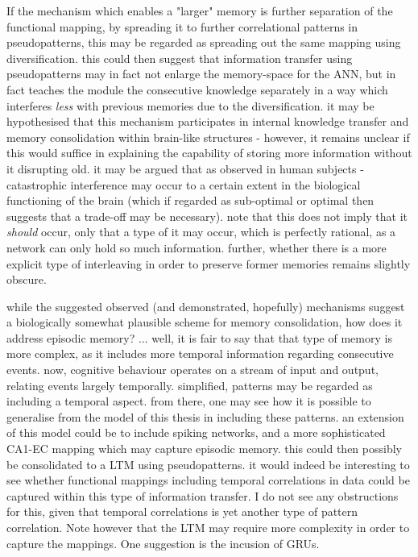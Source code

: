 If the mechanism which enables a "larger" memory is further separation of the functional mapping, by spreading it to further correlational patterns in pseudopatterns, this may be regarded as spreading out the same mapping using diversification. this could then suggest that information transfer using pseudopatterns may in fact not enlarge the memory-space for the ANN, but in fact teaches the module the consecutive knowledge separately in a way which interferes \textit{less} with previous memories due to the diversification.
it may be hypothesised that this mechanism participates in internal knowledge transfer and memory consolidation within brain-like structures - however, it remains unclear if this would suffice in explaining the capability of storing more information without it disrupting old. it may be argued that as observed in human subjects - catastrophic interference may occur to a certain extent in the biological functioning of the brain (which if regarded as sub-optimal or optimal then suggests that a trade-off may be necessary). note that this does not imply that it \textit{should} occur, only that a type of it may occur, which is perfectly rational, as a network can only hold so much information.
further, whether there is a more explicit type of interleaving in order to preserve former memories remains slightly obscure. 

while the suggested observed (and demonstrated, hopefully) mechanisms suggest a biologically somewhat plausible scheme for memory consolidation, how does it address episodic memory?
... 
well, it is fair to say that that type of memory is more complex, as it includes more temporal information regarding consecutive events. now, cognitive behaviour operates on a stream of input and output, relating events largely temporally. simplified, patterns may be regarded as including a temporal aspect. from there, one may see how it is possible to generalise from the model of this thesis in including these patterns. 
an extension of this model could be to include spiking networks, and a more sophisticated CA1-EC mapping which may capture episodic memory. this could then possibly be consolidated to a LTM using pseudopatterns. it would indeed be interesting to see whether functional mappings including temporal correlations in data could be captured within this type of information transfer. I do not see any obstructions for this, given that temporal correlations is yet another type of pattern correlation. Note however that the LTM may require more complexity in order to capture the mappings. One suggestion is the incusion of GRUs.
\\

